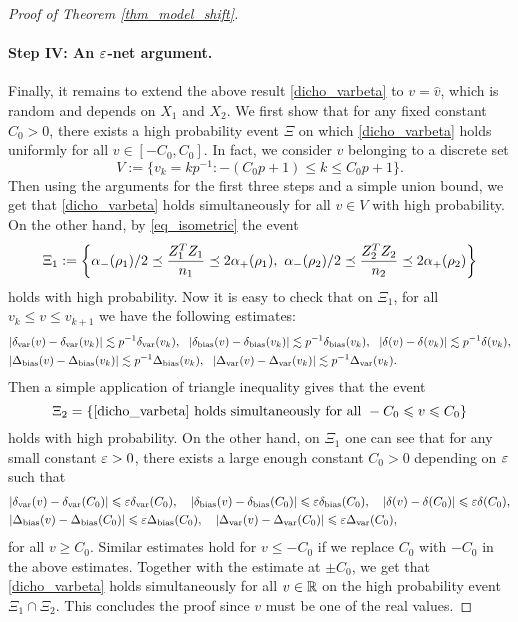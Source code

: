 \begin{proof}[Proof of Theorem \ref{thm_model_shift}]
\paragraph{Step IV: An $\e$-net argument.} Finally, it remains to extend the above result \eqref{dicho_varbeta} to $v=\hat v$, which is random and depends on $X_1$ and $X_2$. We first show that for any fixed constant $C_0>0$, there exists a high probability event $\Xi$ on which \eqref{dicho_varbeta} 
holds uniformly for all $v\in [-C_0, C_0]$. In fact, we consider $v$ belonging to a discrete set 
$$V:=\{v_k = kp^{-1}: -(C_0p +1)\le k \le C_0p +1\}.$$
Then using the arguments for the first three steps and a simple union bound, we get that
\eqref{dicho_varbeta} holds simultaneously for all $v\in V$ with high probability. On the other hand, by \eqref{eq_isometric} the event
$$\Xi_1:=\left\{ \al_-(\rho_1)/2 \preceq  \frac{Z_1^T Z_1}{n_1}  \preceq   2\al_+(\rho_1) ,\  \al_-(\rho_2)/2 \preceq  \frac{Z_2^T Z_2}{n_2}  \preceq   2\al_+(\rho_2)\right\}$$
holds with high probability. Now it is easy to check that on $\Xi_1$, for all $v_k \le v\le v_{k+1}$ we have the following estimates:
\begin{align*}
& |\delta_{\vari}(v) -\delta_{\vari}(v_k)|\lesssim p^{-1}\delta_{\vari}(v_k),\ \ |\delta_{\bias}(v) -\delta_{\bias}(v_k)|\lesssim p^{-1}\delta_{\bias}(v_k), \ \   |\delta(v)-\delta(v_k)|\lesssim p^{-1}\delta(v_k),\\
& |\Delta_{\bias}(v) -\Delta_{\bias}(v_k)|\lesssim p^{-1}\Delta_{\bias}(v_k),\ \ |\Delta_{\vari}(v) -\Delta_{\vari}(v_k)|\lesssim p^{-1}\Delta_{\vari}(v_k).
\end{align*}
Then a simple application of triangle inequality gives that the event 
$$\Xi_2=\{\eqref{dicho_varbeta} \text{ holds simultaneously for all }-C_0\le v \le C_0\}$$
holds with high probability. On the other hand, on $\Xi_1$ one can see that for any small constant $\e>0$, there exists a large enough constant $C_0>0$ depending on $\e$ such that
\begin{align*}
& |\delta_{\vari}(v) -\delta_{\vari}(C_0)|\le \e\delta_{\vari}(C_0),\quad |\delta_{\bias}(v) -\delta_{\bias}(C_0)|\le \e\delta_{\bias}(C_0), \quad  |\delta(v)-\delta(C_0)|\le \e\delta(C_0),\\
& |\Delta_{\bias}(v) -\Delta_{\bias}(C_0)|\le \e\Delta_{\bias}(C_0),\quad |\Delta_{\vari}(v) -\Delta_{\vari}(C_0)|\le \e\Delta_{\vari}(C_0),
\end{align*}
for all $v\ge C_0$. Similar estimates hold for $v\le -C_0$ if we replace $C_0$ with $-C_0$ in the above estimates. Together with the estimate at $\pm C_0$, we get that \eqref{dicho_varbeta} holds simultaneously for all $v\in \R$ on the high probability event $\Xi_1\cap \Xi_2$. This concludes the proof since $v$ must be one of the real values.
\end{proof}





